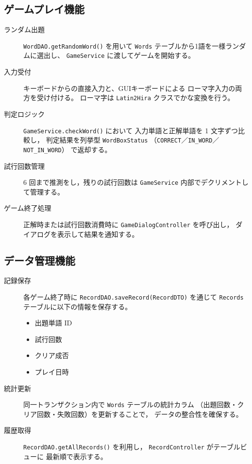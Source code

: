 \documentclass[a4j]{ujarticle}
\begin{document}
\subsection{ゲームプレイ機能}
\begin{description}
  \item[ランダム出題]%
    \texttt{WordDAO.getRandomWord()} を用いて
    \texttt{Words} テーブルから1語を一様ランダムに選出し、
    \texttt{GameService} に渡してゲームを開始する。
  \item[入力受付]%
    キーボードからの直接入力と、GUIキーボードによる
    ローマ字入力の両方を受け付ける。
    ローマ字は \texttt{Latin2Hira} クラスでかな変換を行う。
  \item[判定ロジック]%
    \texttt{GameService.checkWord()} において
    入力単語と正解単語を 1 文字ずつ比較し，
    判定結果を列挙型 \texttt{WordBoxStatus}%
    （\texttt{CORRECT}／\texttt{IN\_WORD}／\texttt{NOT\_IN\_WORD}）
    で返却する。
  \item[試行回数管理]%
    6 回まで推測をし，残りの試行回数は
    \texttt{GameService} 内部でデクリメントして管理する。
  \item[ゲーム終了処理]%
    正解時または試行回数消費時に
    \texttt{GameDialogController} を呼び出し，
    ダイアログを表示して結果を通知する。
\end{description}

\subsection{データ管理機能}
\begin{description}
  \item[記録保存]%
    各ゲーム終了時に
    \texttt{RecordDAO.saveRecord(RecordDTO)} を通じて
    \texttt{Records} テーブルに以下の情報を保存する。
    \begin{itemize}
      \item 出題単語 ID
      \item 試行回数
      \item クリア成否
      \item プレイ日時
    \end{itemize}
  \item[統計更新]%
    同一トランザクション内で
    \texttt{Words} テーブルの統計カラム
    （出題回数・クリア回数・失敗回数）を更新することで，
    データの整合性を確保する。
  \item[履歴取得]%
    \texttt{RecordDAO.getAllRecords()} を利用し，
    \texttt{RecordController} がテーブルビューに
    最新順で表示する。
\end{description}
\end{document}
